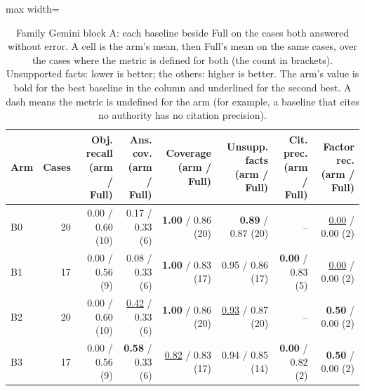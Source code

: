 \begin{table}[t]
\centering\footnotesize
\begin{adjustbox}{max width=\textwidth}
\begin{tabular}{@{}lrrrrrrr@{}}
\toprule
Arm & Cases & Obj. recall (arm / Full) & Ans. cov. (arm / Full) & Coverage (arm / Full) & Unsupp. facts (arm / Full) & Cit. prec. (arm / Full) & Factor rec. (arm / Full) \\
\midrule
B0 & 20 & 0.00 / 0.60 (10) & 0.17 / 0.33 (6) & \textbf{1.00} / 0.86 (20) & \textbf{0.89} / 0.87 (20) & -- & \underline{0.00} / 0.00 (2) \\
B1 & 17 & 0.00 / 0.56 (9) & 0.08 / 0.33 (6) & \textbf{1.00} / 0.83 (17) & 0.95 / 0.86 (17) & \textbf{0.00} / 0.83 (5) & \underline{0.00} / 0.00 (2) \\
B2 & 20 & 0.00 / 0.60 (10) & \underline{0.42} / 0.33 (6) & \textbf{1.00} / 0.86 (20) & \underline{0.93} / 0.87 (20) & -- & \textbf{0.50} / 0.00 (2) \\
B3 & 17 & 0.00 / 0.56 (9) & \textbf{0.58} / 0.33 (6) & \underline{0.82} / 0.83 (17) & 0.94 / 0.85 (14) & \textbf{0.00} / 0.82 (2) & \textbf{0.50} / 0.00 (2) \\
\bottomrule
\end{tabular}
\end{adjustbox}
\caption{Family Gemini block A: each baseline beside Full on the cases both answered without error. A cell is the arm's mean, then Full's mean on the same cases, over the cases where the metric is defined for both (the count in brackets). Unsupported facts: lower is better; the others: higher is better. The arm's value is bold for the best baseline in the column and underlined for the second best. A dash means the metric is undefined for the arm (for example, a baseline that cites no authority has no citation precision).}
\label{tab:main_gemini}
\end{table}